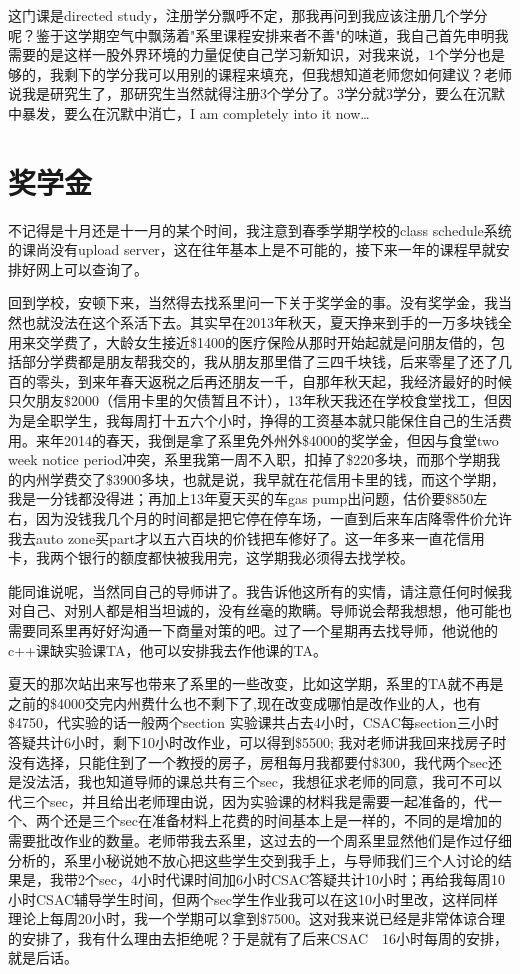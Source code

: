 \documentclass[12pt]{book}
\begin{document}
这门课是directed study，注册学分飘呼不定，那我再问到我应该注册几个学分呢？鉴于这学期空气中飘荡着"系里课程安排来者不善"的味道，我自己首先申明我需要的是这样一股外界环境的力量促使自己学习新知识，对我来说，1个学分也是够的，我剩下的学分我可以用别的课程来填充，但我想知道老师您如何建议？老师说我是研究生了，那研究生当然就得注册3个学分了。3学分就3学分，要么在沉默中暴发，要么在沉默中消亡，I am completely into it now…

\chapter{奖学金}
\label{sec-9}
不记得是十月还是十一月的某个时间，我注意到春季学期学校的class schedule系统的课尚没有upload server，这在往年基本上是不可能的，接下来一年的课程早就安排好网上可以查询了。

回到学校，安顿下来，当然得去找系里问一下关于奖学金的事。没有奖学金，我当然也就没法在这个系活下去。其实早在2013年秋天，夏天挣来到手的一万多块钱全用来交学费了，大龄女生接近\$1400的医疗保险从那时开始起就是问朋友借的，包括部分学费都是朋友帮我交的，我从朋友那里借了三四千块钱，后来零星了还了几百的零头，到来年春天返税之后再还朋友一千，自那年秋天起，我经济最好的时候只欠朋友\$2000（信用卡里的欠债暂且不计），13年秋天我还在学校食堂找工，但因为是全职学生，我每周打十五六个小时，挣得的工资基本就只能保住自己的生活费用。来年2014的春天，我倒是拿了系里免外州外\$4000的奖学金，但因与食堂two week notice period冲突，系里我第一周不入职，扣掉了\$220多块，而那个学期我的内州学费交了\$3900多块，也就是说，我早就在花信用卡里的钱，而这个学期，我是一分钱都没得进；再加上13年夏天买的车gas pump出问题，估价要\$850左右，因为没钱我几个月的时间都是把它停在停车场，一直到后来车店降零件价允许我去auto zone买part才以五六百块的价钱把车修好了。这一年多来一直花信用卡，我两个银行的额度都快被我用完，这学期我必须得去找学校。

能同谁说呢，当然同自己的导师讲了。我告诉他这所有的实情，请注意任何时候我对自己、对别人都是相当坦诚的，没有丝毫的欺瞒。导师说会帮我想想，他可能也需要同系里再好好沟通一下商量对策的吧。过了一个星期再去找导师，他说他的c++课缺实验课TA，他可以安排我去作他课的TA。

夏天的那次站出来写也带来了系里的一些改变，比如这学期，系里的TA就不再是之前的\$4000交完内州费什么也不剩下了,现在改变成哪怕是改作业的人，也有\$4750，代实验的话一般两个section 实验课共占去4小时，CSAC每section三小时答疑共计6小时，剩下10小时改作业，可以得到\$5500; 我对老师讲我回来找房子时没有选择，只能住到了一个教授的房子，房租每月我都要付\$300，我代两个sec还是没法活，我也知道导师的课总共有三个sec，我想征求老师的同意，我可不可以代三个sec，并且给出老师理由说，因为实验课的材料我是需要一起准备的，代一个、两个还是三个sec在准备材料上花费的时间基本上是一样的，不同的是增加的需要批改作业的数量。老师带我去系里，这过去的一个周系里显然他们是作过仔细分析的，系里小秘说她不放心把这些学生交到我手上，与导师我们三个人讨论的结果是，我带2个sec，4小时代课时间加6小时CSAC答疑共计10小时；再给我每周10小时CSAC辅导学生时间，但两个sec学生作业我可以在这10小时里改，这样同样理论上每周20小时，我一个学期可以拿到\$7500。这对我来说已经是非常体谅合理的安排了，我有什么理由去拒绝呢？于是就有了后来CSAC　16小时每周的安排，就是后话。
\end{document}
